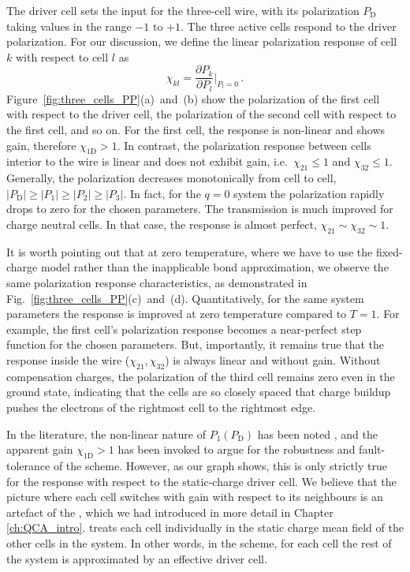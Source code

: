 The driver cell sets the input for the three-cell wire, with its
polarization $P_\text{D}$ taking values in the range $-1$ to $+1$. The three active
cells respond to the driver polarization. For our discussion, we define the
linear polarization response of cell $k$ with respect to cell $l$ as
%
\begin{equation}
  \label{eq:polarization_response}
  \chi_{kl} = \frac{\partial P_k}{\partial P_l}\big|_{P_l = 0} \, .
\end{equation}
%
Figure~\ref{fig:three_cells_PP}(a)~and~(b) show the polarization of the first cell
with respect to the driver cell, the polarization of the second cell with
respect to the first cell, and so on. For the first cell, the response is
non-linear and shows gain, therefore $\chi_{1\text{D}} > 1$. In contrast, the
polarization response between cells interior to the wire is linear and does not
exhibit gain, i.e.~$\chi_{21} \le 1$ and $\chi_{32} \le 1$. Generally, the
polarization decreases monotonically from cell to cell, $|P_\text{D}| \ge |P_1| \ge
|P_2| \ge |P_3|$. In fact, for the $q=0$ system the polarization rapidly drops
to zero for the chosen parameters. The transmission is much improved for charge
neutral cells. In that case, the response is almost perfect, $\chi_{21} \sim
\chi_{32} \sim 1$.

It is worth pointing out that at zero temperature, where we have to use the
fixed-charge model rather than the inapplicable bond approximation, we observe
the same polarization response characteristics, as demonstrated in
Fig.~\ref{fig:three_cells_PP}(c)~and~(d). Quantitatively, for the same system
parameters the response is improved at zero temperature compared to $T=1$. For
example, the first cell's polarization response becomes a near-perfect step
function for the chosen parameters. But, importantly, it remains true that the
response inside the wire ($\chi_{21}, \chi_{32}$) is always linear and without
gain. Without compensation charges, the polarization of the third cell remains
zero even in the ground state, indicating that the cells are so closely spaced
that charge buildup pushes the electrons of the rightmost cell to the rightmost
edge.

In the literature, the non-linear nature of $P_1(P_\text{D})$ has been noted
\cite{lent1993quantum, lent1993lines}, and the apparent gain $\chi_{1\text{D}} >
1$ has been invoked to argue for the robustness and fault-tolerance of the
 scheme. However, as our graph shows, this is only strictly true for
the response with respect to the static-charge driver cell. We believe that the
picture where each cell switches with gain with respect to its neighbours is an
artefact of the , which we had introduced in more detail in Chapter
\ref{ch:QCA_intro}.  treats each cell individually in the static
charge mean field of the other cells in the system. In other words, in the
 scheme, for each cell the rest of the system is approximated by an
effective driver cell.

